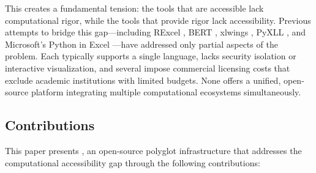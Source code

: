 This creates a fundamental tension: the tools that are accessible lack computational rigor, while the tools that provide rigor lack accessibility. Previous attempts to bridge this gap---including RExcel \citep{Baier2011}, BERT \citep{BERT2018}, xlwings \citep{xlwings2023}, PyXLL \citep{PyXLL2023}, and Microsoft's Python in Excel \citep{MicrosoftPython2023}---have addressed only partial aspects of the problem. Each typically supports a single language, lacks security isolation or interactive visualization, and several impose commercial licensing costs that exclude academic institutions with limited budgets. None offers a unified, open-source platform integrating multiple computational ecosystems simultaneously.

\subsection{Contributions}

This paper presents \neven{}, an open-source polyglot infrastructure that addresses the computational accessibility gap through the following contributions:

